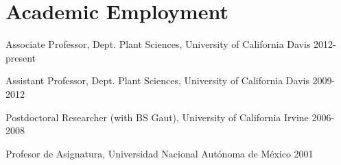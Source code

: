 \documentclass[letterpaper]{article}
\renewenvironment{itemize}{
  \begin{list}{}{
    \setlength{\leftmargin}{1.5em}
  }
}{
  \end{list}
}
\begin{document}
\section*{Academic Employment}
\begin{itemize}
\item Associate Professor, Dept. Plant Sciences, University of California Davis 2012-present
\item Assistant Professor, Dept. Plant Sciences, University of California Davis 2009-2012
\item Postdoctoral Researcher (with BS Gaut), University of California Irvine 2006-2008
\item Profesor de Asignatura, Universidad Nacional Aut\'{o}noma de M\'{e}xico 2001
\end{itemize}

\end{document}
